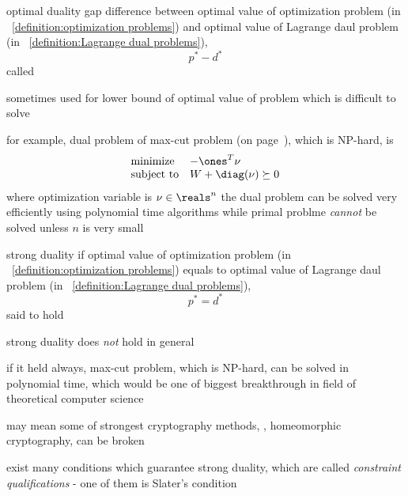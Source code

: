 \documentclass[17pt,landscape]{foils}
\begin{document}
{

\begin{mydefinition}{optimal duality gap}
	difference between
	optimal value of optimization problem (in ~\ref{definition:optimization problems})
	and
	optimal value of Lagrange daul problem (in ~\ref{definition:Lagrange dual problems}),
	\ie\
	$$
		p^\ast - d^\ast
	$$
	called 
\end{mydefinition}

\bit
\item
	sometimes used for lower bound of optimal value of problem which is difficult to solve
	\bit
	\item
		for example,
		dual problem
		of max-cut problem (on page~\pageref{page:max-cut problem}),
		which is NP-hard,
		is
		$$
			\begin{array}{ll}
				\mbox{minimize} &
					-\ones^T \nu
				\\
				\mbox{subject to} &
					W + \diag(\nu) \succeq 0
			\end{array}
		$$
		where optimization variable is $\nu\in\reals^n$
		\bit
		\iitem
			the dual problem can be solved very efficiently using polynomial time algorithms
			while primal problme \emph{cannot} be solved unless $n$ is very small
		\eit
	\eit
\eit



\begin{mydefinition}{strong duality}
	if
	optimal value of optimization problem (in ~\ref{definition:optimization problems})
	equals to
	optimal value of Lagrange daul problem (in ~\ref{definition:Lagrange dual problems}),
	\ie\
	$$
		p^\ast = d^\ast
	$$
	 said to hold
\end{mydefinition}

\bit
\item
	strong duality does \emph{not} hold in general
	\bit
	\item
		if it held always, max-cut problem, which is NP-hard, can be solved in polynomial time,
		which would be one of biggest breakthrough in field of theoretical computer science
	\item
		may mean some of strongest cryptography methods, \eg, homeomorphic cryptography,
		can be broken
	\eit
\eit



\bit
\item
	exist many conditions
	which guarantee strong duality,
	which are called \emph{constraint qualifications}
	- one of them is Slater's condition
\eit

}
\end{document}
